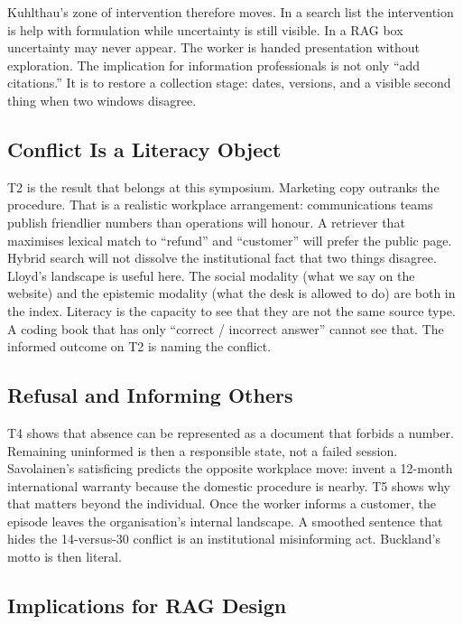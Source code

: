 \documentclass{isi2027}
\begin{document}
Kuhlthau's \citep{Kuhlthau1991} zone of intervention therefore moves. In a search list the intervention is help with formulation while uncertainty is still visible. In a RAG box uncertainty may never appear. The worker is handed presentation without exploration. The implication for information professionals is not only ``add citations.'' It is to restore a collection stage: dates, versions, and a visible second thing when two windows disagree.

\subsection{Conflict Is a Literacy Object}

T2 is the result that belongs at this symposium. Marketing copy outranks the procedure. That is a realistic workplace arrangement: communications teams publish friendlier numbers than operations will honour. A retriever that maximises lexical match to ``refund'' and ``customer'' will prefer the public page. Hybrid search will not dissolve the institutional fact that two things disagree. Lloyd's \citep{Lloyd2010} landscape is useful here. The social modality (what we say on the website) and the epistemic modality (what the desk is allowed to do) are both in the index. Literacy is the capacity to see that they are not the same source type. A coding book that has only ``correct / incorrect answer'' cannot see that. The informed outcome on T2 is naming the conflict.

\subsection{Refusal and Informing Others}

T4 shows that absence can be represented as a document that forbids a number. Remaining uninformed is then a responsible state, not a failed session. Savolainen's \citep{Savolainen1995} satisficing predicts the opposite workplace move: invent a 12-month international warranty because the domestic procedure is nearby. T5 shows why that matters beyond the individual. Once the worker informs a customer, the episode leaves the organisation's internal landscape. A smoothed sentence that hides the 14-versus-30 conflict is an institutional misinforming act. Buckland's motto is then literal.

\subsection{Implications for RAG Design}
\end{document}
